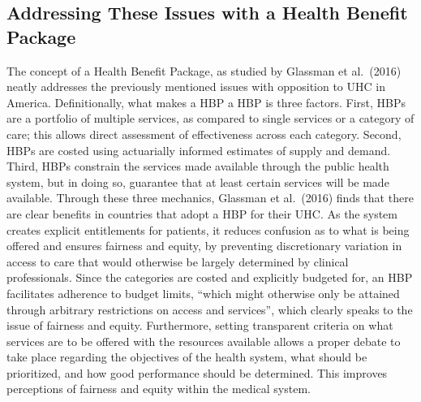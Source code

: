 \documentclass[
]{article}
\begin{document}
\hypertarget{addressing-these-issues-with-a-health-benefit-package}{%
\subsection{Addressing These Issues with a Health Benefit
Package}\label{addressing-these-issues-with-a-health-benefit-package}}

The concept of a Health Benefit Package, as studied by Glassman et
al.~(2016) neatly addresses the previously mentioned issues with
opposition to UHC in America. Definitionally, what makes a HBP a HBP is
three factors. First, HBPs are a portfolio of multiple services, as
compared to single services or a category of care; this allows direct
assessment of effectiveness across each category. Second, HBPs are
costed using actuarially informed estimates of supply and demand. Third,
HBPs constrain the services made available through the public health
system, but in doing so, guarantee that at least certain services will
be made available. Through these three mechanics, Glassman et al.~(2016)
finds that there are clear benefits in countries that adopt a HBP for
their UHC. As the system creates explicit entitlements for patients, it
reduces confusion as to what is being offered and ensures fairness and
equity, by preventing discretionary variation in access to care that
would otherwise be largely determined by clinical professionals. Since
the categories are costed and explicitly budgeted for, an HBP
facilitates adherence to budget limits, ``which might otherwise only be
attained through arbitrary restrictions on access and services'', which
clearly speaks to the issue of fairness and equity. Furthermore, setting
transparent criteria on what services are to be offered with the
resources available allows a proper debate to take place regarding the
objectives of the health system, what should be prioritized, and how
good performance should be determined. This improves perceptions of
fairness and equity within the medical system.
\end{document}
